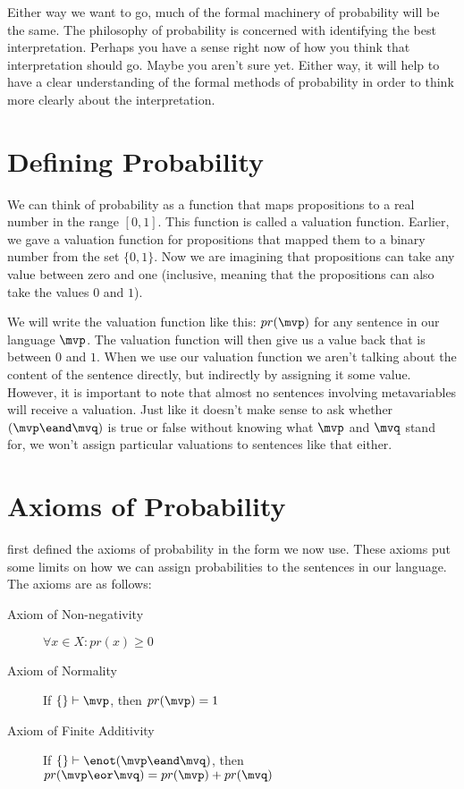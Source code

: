 Either way we want to go, much of the formal machinery of probability will be the same. The philosophy of probability is concerned with identifying the best interpretation. Perhaps you have a sense right now of how you think that interpretation should go. Maybe you aren't sure yet. Either way, it will help to have a clear understanding of the formal methods of probability in order to think more clearly about the interpretation.

\section{Defining Probability}

We can think of probability as a function that maps propositions to a real number in the range $[0,1]$. This function is called a valuation function. Earlier, we gave a valuation function for propositions that mapped them to a binary number from the set $\{0,1\}$. Now we are imagining that propositions can take any value between zero and one (inclusive, meaning that the propositions can also take the values $0$ and $1$).

We will write the valuation function like this: $pr(\mvp)$ for any sentence in our language $\mvp$. The valuation function will then give us a value back that is between $0$ and $1$. When we use our valuation function we aren't talking about the content of the sentence directly, but indirectly by assigning it some value. However, it is important to note that almost no sentences involving metavariables will receive a valuation. Just like it doesn't make sense to ask whether $(\mvp\eand\mvq)$ is true or false without knowing what $\mvp$ and $\mvq$ stand for, we won't assign particular valuations to sentences like that either.

\section{Axioms of Probability}\label{sec:axiomsofprobability}

\citet{kolmogorov1933} first defined the axioms of probability in the form we now use. These axioms put some limits on how we can assign probabilities to the sentences in our language. The axioms are as follows:

\begin{description}
  \item[Axiom of Non-negativity] $\forall x \in X : pr(x) \ge 0$
  \item[Axiom of Normality] If $\{\}\vdash\mvp$, then $pr(\mvp)=1$
  \item[Axiom of Finite Additivity] If $\{\}\vdash\enot(\mvp\eand\mvq)$, then $pr(\mvp\eor\mvq)=pr(\mvp)+pr(\mvq)$
\end{description}

